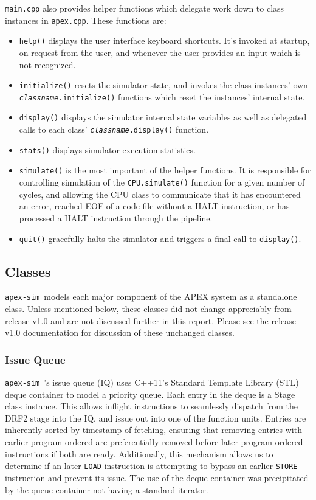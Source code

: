 \documentclass[12pt]{article}
\newcommand{\codename}[0]{\texttt{apex-sim}~}
\begin{document}
\texttt{main.cpp} also provides helper functions which delegate work down to class instances in \texttt{apex.cpp}. These functions are:
\begin{itemize}
  \item \texttt{help()} displays the user interface keyboard shortcuts. It's invoked at startup, on request from the user, and whenever the user provides an input which is not recognized.
  \item \texttt{initialize()} resets the simulator state, and invokes the class instances' own \texttt{\textit{classname}.initialize()} functions which reset the instances' internal state.
  \item \texttt{display()} displays the simulator internal state variables as well as delegated calls to each class' \texttt{\textit{classname}.display()} function.
  \item \texttt{stats()} displays simulator execution statistics.
  \item \texttt{simulate()} is the most important of the helper functions. It is responsible for controlling simulation of the \texttt{CPU.simulate()} function for a given number of cycles, and allowing the CPU class to communicate that it has encountered an error, reached EOF of a code file without a HALT instruction, or has processed a HALT instruction through the pipeline.
  \item \texttt{quit()} gracefully halts the simulator and triggers a final call to \texttt{display()}.
\end{itemize}

\subsection{Classes}
\label{sec:classes}
\codename models each major component of the APEX system as a standalone class. Unless mentioned below, these classes did not change appreciably from release v1.0 and are not discussed further in this report. Please see the release v1.0 documentation for discussion of these unchanged classes.

\subsubsection{Issue Queue}
\codename's issue queue (IQ) uses C++11's Standard Template Library (STL) deque container to model a priority queue. 
Each entry in the deque is a Stage class instance. 
This allows inflight instructions to seamlessly dispatch from the DRF2 stage into the IQ, and issue out into one of the function units. 
Entries are inherently sorted by timestamp of fetching, ensuring that removing entries with earlier program-ordered are preferentially removed before later program-ordered instructions if both are ready. 
Additionally, this mechanism allows us to determine if an later \texttt{LOAD} instruction is attempting to bypass an earlier \texttt{STORE} instruction and prevent its issue. 
The use of the deque container was precipitated by the queue container not having a standard iterator.
\end{document}
